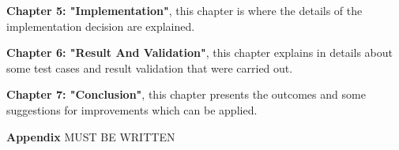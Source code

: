         \par
        \textbf{Chapter 5: "Implementation"}, this chapter is where the details of the 
        implementation decision are explained.

        \par
        \textbf{Chapter 6: "Result And Validation"}, this chapter explains in details about 
        some test cases and result validation that were carried out.

        \par
        \textbf{Chapter 7: "Conclusion"}, this chapter presents the outcomes and some 
        suggestions for improvements which can be applied.
        
        \par
        \textbf{Appendix}
        MUST BE WRITTEN

